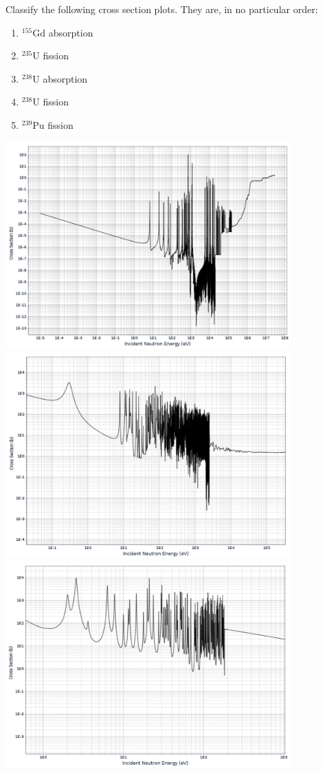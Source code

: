\documentclass{report}
\begin{document}
Classify the following cross section plots. They are, in no particular order:
\begin{enumerate}[(1)]
\item $^{155}$Gd absorption
\item $^{235}$U fission
\item $^{238}$U absorption
\item $^{238}$U fission
\item $^{239}$Pu fission
\end{enumerate}

\begin{center}
\includegraphics[width=11cm]{u238_fission.png}\\
\includegraphics[width=11cm]{pu239_fission.png}\\
\includegraphics[width=11cm]{gd155_absorption.png}\\

\end{center}
\end{document}
